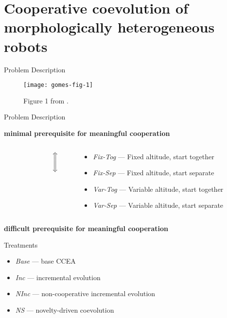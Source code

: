 \section{Cooperative coevolution of morphologically heterogeneous robots \cite{gomes2015cooperative}}

\begin{frame}{Problem Description}

\begin{figure}

\texttt{[image: gomes-fig-1]}

\caption{
Figure 1 from \cite{gomes2015cooperative}.
}

\end{figure}

\end{frame}

\begin{frame}{Problem Description}

{\Large
\textbf{minimal prerequisite for meaningful cooperation}
}

\vspace{1ex}

\begin{columns}
\begin{column}{0.02\textwidth}
\end{column}
\begin{column}{0.02\textwidth}
\Huge
\[
\bm{\Bigg\Updownarrow}
\]
\end{column}
\begin{column}{0.96\textwidth}
\begin{itemize}
\item[] \textit{Fix-Tog} --- Fixed altitude, start together
\item[] \textit{Fix-Sep} --- Fixed altitude, start separate
\item[] \textit{Var-Tog} --- Variable altitude, start together
\item[] \textit{Var-Sep} --- Variable altitude, start separate
\end{itemize}
\end{column}
\end{columns}

\vspace{1ex}

{\Large
\textbf{difficult prerequisite for meaningful cooperation}
}

\end{frame}

\begin{frame}{Treatments}

\Large
\begin{itemize}
\item \textit{Base} ---  base CCEA
\item \textit{Inc} --- incremental evolution
\item \textit{NInc} --- non-cooperative incremental evolution
\item \textit{NS} --- novelty-driven coevolution
\end{itemize}
\end{frame}

